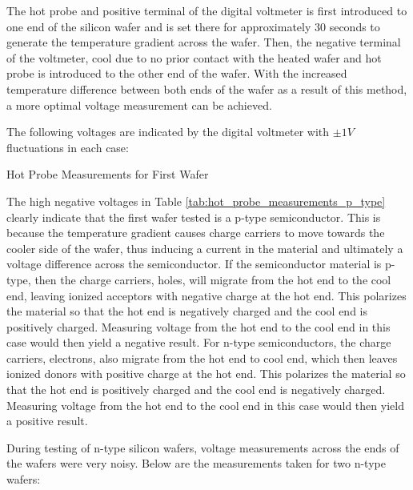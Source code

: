 \documentclass{article}
\begin{document}
	\FloatBarrier
	
	The hot probe and positive terminal of the digital voltmeter is first introduced to one end of the silicon wafer and is set there for approximately 30 seconds to generate the temperature gradient across the wafer. Then, the negative terminal of the voltmeter, cool due to no prior contact with the heated wafer and hot probe is introduced to the other end of the wafer. With the increased temperature difference between both ends of the wafer as a result of this method, a more optimal voltage measurement can be achieved.
	
	The following voltages are indicated by the digital voltmeter with $\pm 1 V$ fluctuations in each case:
	
	\FloatBarrier

	\begin{table}[h!]
		\centering
		\caption{Hot Probe Measurements for First Wafer}
		\label{tab:hot_probe_measurements_p_type}
	\end{table}

	\FloatBarrier
	
	The high negative voltages in Table \ref{tab:hot_probe_measurements_p_type} clearly indicate that the first wafer tested is a p-type semiconductor. This is because the temperature gradient causes charge carriers to move towards the cooler side of the wafer, thus inducing a current in the material and ultimately a voltage difference across the semiconductor. If the semiconductor material is p-type, then the charge carriers, holes, will migrate from the hot end to the cool end, leaving ionized acceptors with negative charge at the hot end. This polarizes the material so that the hot end is negatively charged and the cool end is positively charged. Measuring voltage from the hot end to the cool end in this case would then yield a negative result. For n-type semiconductors, the charge carriers, electrons, also migrate from the hot end to cool end, which then leaves ionized donors with positive charge at the hot end. This polarizes the material so that the hot end is positively charged and the cool end is negatively charged. Measuring voltage from the hot end to the cool end in this case would then yield a positive result.
	
	During testing of n-type silicon wafers, voltage measurements across the ends of the wafers were very noisy. Below are the measurements taken for two n-type wafers:
	
	\FloatBarrier
\end{document}
